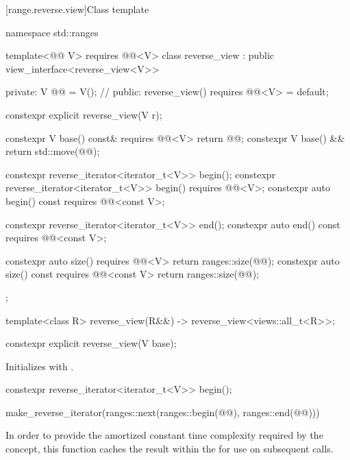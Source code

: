[range.reverse.view]{Class template }

%
%
%
\begin{codeblock}
namespace std::ranges {
  template<@@ V>
    requires @@<V>
  class reverse_view : public view_interface<reverse_view<V>> {
  private:
    V @@ = V();  // \expos
  public:
    reverse_view() requires @@<V> = default;

    constexpr explicit reverse_view(V r);

    constexpr V base() const& requires @@<V> { return @@; }
    constexpr V base() && { return std::move(@@); }

    constexpr reverse_iterator<iterator_t<V>> begin();
    constexpr reverse_iterator<iterator_t<V>> begin() requires @@<V>;
    constexpr auto begin() const requires @@<const V>;

    constexpr reverse_iterator<iterator_t<V>> end();
    constexpr auto end() const requires @@<const V>;

    constexpr auto size() requires @@<V> {
      return ranges::size(@@);
    }
    constexpr auto size() const requires @@<const V> {
      return ranges::size(@@);
    }
  };

  template<class R>
    reverse_view(R&&) -> reverse_view<views::all_t<R>>;
}
\end{codeblock}

%
\begin{itemdecl}
constexpr explicit reverse_view(V base);
\end{itemdecl}

\begin{itemdescr}
\pnum
\effects
Initializes  with .
\end{itemdescr}

%
\begin{itemdecl}
constexpr reverse_iterator<iterator_t<V>> begin();
\end{itemdecl}

\begin{itemdescr}
\pnum
\returns
\begin{codeblock}
make_reverse_iterator(ranges::next(ranges::begin(@@), ranges::end(@@)))
\end{codeblock}

\pnum
\remarks
In order to provide the amortized constant time complexity required by
the  concept, this function caches the result within the
 for use on subsequent calls.
\end{itemdescr}

